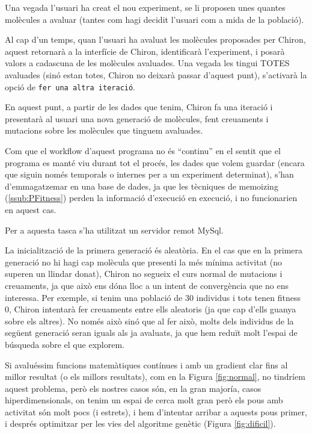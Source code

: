 Una vegada l'usuari ha creat el nou experiment, se li proposen unes quantes
molècules a avaluar (tantes com hagi decidit l'usuari com a mida de la
població).

Al cap d'un temps, quan l'usuari ha avaluat les molècules proposades per Chiron,
aquest retornarà a la interfície de Chiron, identificarà l'experiment, i posarà
valors a cadascuna de les molècules avaluades.  Una vegada les tingui TOTES
avaluades (sinó estan totes, Chiron no deixarà passar d'aquest punt), s'activarà
la opció de \texttt{fer una altra iteració}.  

En aquest punt, a partir de les dades que tenim, Chiron fa una iteració i
presentarà al usuari una nova generació de molècules, fent creuaments i
mutacions sobre les molècules que tinguem avaluades.

Com que el workflow d'aquest programa no és ``continu'' en el sentit que el
programa es manté viu durant tot el procés, les dades que volem guardar (encara
que siguin només temporals o internes per a un experiment determinat), s'han
d'emmagatzemar en una base de dades, ja que les tècniques de memoizing (\ref{ssub:PFitness})
perden la informació d'execució en execució, i no funcionarien en aquest cas.

Per a aquesta tasca s'ha utilitzat un servidor remot MySql.

La inicialització de la primera generació és aleatòria. En el cas que en la
primera generació no hi hagi cap molècula que presenti la més mínima activitat
(no superen un llindar donat), Chiron no segueix el curs normal de mutacions i
creuaments, ja que això ens dóna lloc a un intent de convergència que no ens
interessa.  Per exemple, si tenim una població de 30 individus i tots tenen
fitness 0, Chiron intentarà fer creuaments entre ells aleatoris (ja que cap
d'ells guanya sobre els altres).  No només això sinó que al fer això, molts dels
individus de la següent generació seran iguals als ja avaluats, ja que hem
reduït molt l'espai de búsqueda sobre el que explorem.

Si avaluéssim funcions matemàtiques contínues i amb un gradient clar fins al
millor resultat (o els millors resultats), com en la Figura \ref{fig:normal}, no
tindríem aquest problema, però els nostres casos són, en la gran majoría, casos
hiperdimensionals, on tenim un espai de cerca molt gran però els pous amb
activitat són molt pocs (i estrets), i hem d'intentar arribar a aquests pous
primer, i després optimitzar per les vies del algoritme genètic (Figura
\ref{fig:dificil}).

